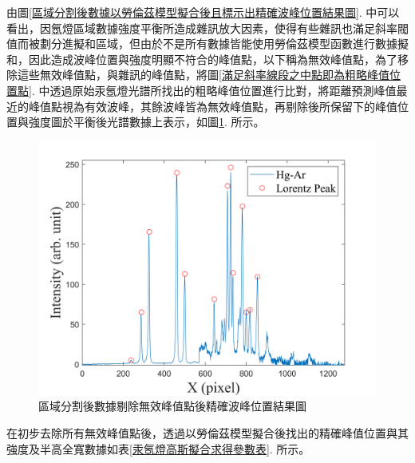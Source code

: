 由圖\ref{區域分割後數據以勞倫茲模型擬合後且標示出精確波峰位置結果圖}. 中可以看出，因氬燈區域數據強度平衡所造成雜訊放大因素，使得有些雜訊也滿足斜率閥值而被劃分進擬和區域，但由於不是所有數據皆能使用勞倫茲模型函數進行數據擬和，因此造成波峰位置與強度明顯不符合的峰值點，以下稱為無效峰值點，為了移除這些無效峰值點，與雜訊的峰值點，將圖\ref{滿足斜率線段之中點即為粗略峰值位置點}. 中透過原始汞氬燈光譜所找出的粗略峰值位置進行比對，將距離預測峰值最近的峰值點視為有效波峰，其餘波峰皆為無效峰值點，再剔除後所保留下的峰值位置與強度圖於平衡後光譜數據上表示，如圖\ref{區域分割後數據剔除無效峰值點後精確波峰位置結果圖}. 所示。
\begin{figure}[H] %
	\centering %
	\includegraphics[width=16cm]{figures/與估測峰值比對後峰值.png} %
	\caption{區域分割後數據剔除無效峰值點後精確波峰位置結果圖} %
	\label{區域分割後數據剔除無效峰值點後精確波峰位置結果圖} %
\end{figure}
在初步去除所有無效峰值點後，透過以勞倫茲模型擬合後找出的精確峰值位置與其強度及半高全寬數據如表\ref{汞氬燈高斯擬合求得參數表}. 所示。
\newpage
